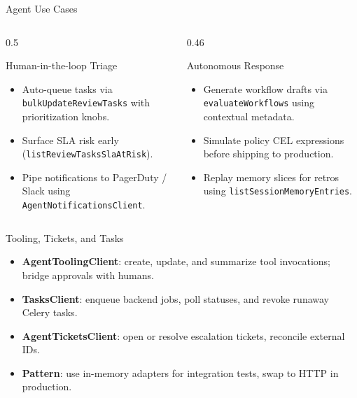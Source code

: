 \documentclass[aspectratio=169]{beamer}
\begin{document}
\begin{frame}{Agent Use Cases}
  \begin{columns}
    \begin{column}{0.5\textwidth}
      \begin{block}{Human-in-the-loop Triage}
        \begin{itemize}
          \item Auto-queue tasks via \texttt{bulkUpdateReviewTasks} with prioritization knobs.
          \item Surface SLA risk early (\texttt{listReviewTasksSlaAtRisk}).
          \item Pipe notifications to PagerDuty / Slack using \texttt{AgentNotificationsClient}.
        \end{itemize}
      \end{block}
    \end{column}
    \begin{column}{0.46\textwidth}
      \begin{block}{Autonomous Response}
        \begin{itemize}
          \item Generate workflow drafts via \texttt{evaluateWorkflows} using contextual metadata.
          \item Simulate policy CEL expressions before shipping to production.
          \item Replay memory slices for retros using \texttt{listSessionMemoryEntries}.
        \end{itemize}
      \end{block}
    \end{column}
  \end{columns}
\end{frame}

\begin{frame}{Tooling, Tickets, and Tasks}
  \begin{itemize}
    \item \textbf{AgentToolingClient}: create, update, and summarize tool invocations; bridge approvals with humans.
    \item \textbf{TasksClient}: enqueue backend jobs, poll statuses, and revoke runaway Celery tasks.
    \item \textbf{AgentTicketsClient}: open or resolve escalation tickets, reconcile external IDs.
    \item \textbf{Pattern}: use in-memory adapters for integration tests, swap to HTTP in production.
  \end{itemize}
\end{frame}
\end{document}
